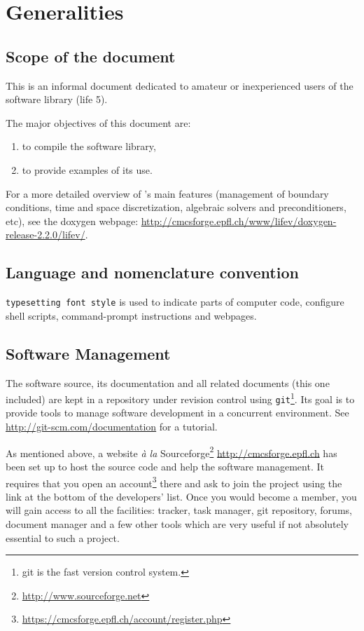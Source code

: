 
\chapter{Generalities}
\label{cha:generalities}

\section{Scope of the document}
\label{sec:scope-document}

This is an informal document dedicated to amateur or inexperienced users of the
software library \thelibrary (life 5).

The major objectives of this document are:
\begin{enumerate}
\item to compile the software library,
\item to provide examples of its use.
\end{enumerate}
For a more detailed overview of \lifev's main features (management of boundary conditions, time and space discretization, algebraic solvers and preconditioners, etc), see the doxygen webpage: \url{http://cmcsforge.epfl.ch/www/lifev/doxygen-release-2.2.0/lifev/}.
\section{Language and nomenclature convention}
\label{sec:lang-nomencl-conv}

\texttt{typesetting font style} is used to indicate parts of
computer code, configure shell scripts, command-prompt instructions and webpages.

\section{Software Management}
\label{sec:software-management}

The software source, its documentation and all related documents (this
one included) are kept in a repository under revision control
using \verb!git!\footnote{git is the fast version control system.}. Its goal
is to provide tools to manage software development in a concurrent environment.
See \url{http://git-scm.com/documentation}
for a tutorial.

As mentioned above, a website {\it\`a la} Sourceforge\footnote{\url{http://www.sourceforge.net}}
\url{http://cmcsforge.epfl.ch} has been set up
to host the source code and help the software management.
It requires that you open an account\footnote{\url{https://cmcsforge.epfl.ch/account/register.php}}
there and ask to join the project \lifev using the link at the
bottom of the developers' list.
Once you would become a member, you will gain access to all the facilities:
tracker, task manager, git repository, forums, document manager and a few other
tools which are very useful if not absolutely essential to such a project.

